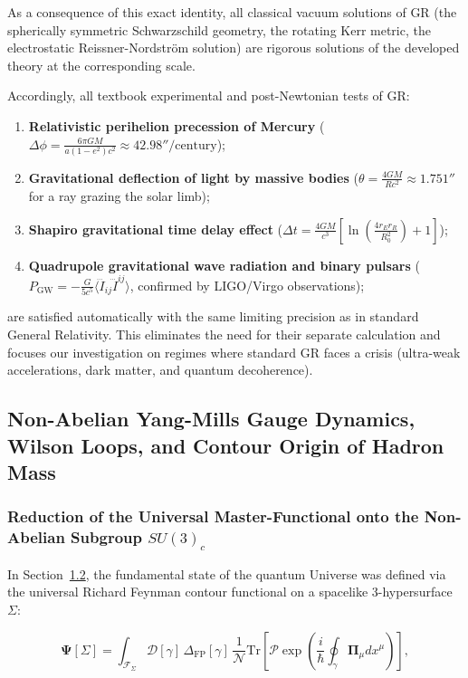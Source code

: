 As a consequence of this exact identity, all classical vacuum solutions of GR (the spherically symmetric Schwarzschild geometry, the rotating Kerr metric, the electrostatic Reissner-Nordstr\"om solution) are rigorous solutions of the developed theory at the corresponding scale.

Accordingly, all textbook experimental and post-Newtonian tests of GR:
\begin{enumerate}
\item \textbf{Relativistic perihelion precession of Mercury} ($\Delta\phi = \frac{6\pi GM}{a(1-e^2)c^2} \approx 42.98''/\text{century}$);
\item \textbf{Gravitational deflection of light by massive bodies} ($\theta = \frac{4GM}{R c^2} \approx 1.751''$ for a ray grazing the solar limb);
\item \textbf{Shapiro gravitational time delay effect} ($\Delta t = \frac{4GM}{c^3} \left[ \ln\left(\frac{4 r_E r_R}{R_0^2}\right) + 1 \right]$);
\item \textbf{Quadrupole gravitational wave radiation and binary pulsars} ($P_{\text{GW}} = -\frac{G}{5 c^5} \langle \dddot{I}_{ij} \dddot{I}^{ij} \rangle$, confirmed by LIGO/Virgo observations);
\end{enumerate}
are satisfied automatically with the same limiting precision as in standard General Relativity. This eliminates the need for their separate calculation and focuses our investigation on regimes where standard GR faces a crisis (ultra-weak accelerations, dark matter, and quantum decoherence).

\subsection{Non-Abelian Yang-Mills Gauge Dynamics, Wilson Loops, and Contour Origin of Hadron Mass}\label{sec:2.3}

\subsubsection{Reduction of the Universal Master-Functional onto the Non-Abelian Subgroup $SU(3)_c$}\label{sec:2.3.1}

In Section~\hyperref[sec:1.2]{1.2}, the fundamental state of the quantum Universe was defined via the universal Richard Feynman contour functional on a spacelike 3-hypersurface $\Sigma$:

\begin{equation}\label{eq:2.3.1}\tag{2.3.1}
\mathbf{\Psi}[\Sigma] = \int_{\mathcal{F}_\Sigma} \mathcal{D}[\gamma] \, \Delta_{\text{FP}}[\gamma] \, \frac{1}{\mathcal{N}} \text{Tr}\left[ \mathcal{P}\exp\left( \frac{i}{\hbar} \oint_{\gamma} \mathbf{\Pi}_\mu dx^\mu \right) \right],
\end{equation}

